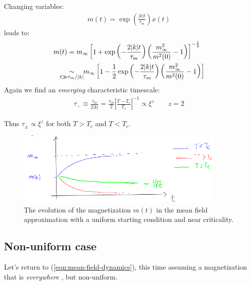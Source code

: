 \documentclass[../../main.tex]{subfiles}
\begin{document}
\begin{itemize}
    Changing variables:
    \begin{align*}
        m(t) = \exp\left(\frac{|k|t}{\tau_m} \right) x(t)
    \end{align*}
    leads to: %
    \begin{align*}
        m(t) &= m_\infty \left[1 + \exp\left(-\frac{2|k|t}{\tau_m} \right) \left(\frac{m^2_\infty}{m^2(0)} - 1 \right)\right]^{-\frac{1}{2}} \\
        &\underset{\mathclap{t \gg \tau_m/|k|}}{\sim} \quad m_\infty \left[1-\frac{1}{2} \exp\left(-\frac{2|k|t}{\tau_m} \right)\left(\frac{m^2_\infty}{m^2(0)} -1\right) \right]
    \end{align*}
    Again we find an \textit{emerging} characteristic timescale:
    \begin{align*}
        \tau_- \equiv \frac{\tau_m}{2|k|} = \frac{\tau_m}{2} \left|\frac{T-T_c}{T_c}  \right|^{-1} \propto \xi^z \qquad z=2
    \end{align*} 
    
    Thus $\tau_\pm \propto \xi^z$ for both $T > T_c$ and $T < T_c$. 
\end{itemize}

\begin{figure}[H]
    \centering
    \includegraphics[width=0.9\textwidth]{magnetization-evolution.png}
    \caption{The evolution of the magnetization $m(t)$ in the mean field approximation with a uniform starting condition and near criticality.}
    \label{fig:magnetization-evolution}
\end{figure}

\subsection{Non-uniform case}
Let's return to (\ref{eqn:mean-field-dynamics}), this time assuming a magnetization that is \textit{everywhere }, but non-uniform.
\end{document}
